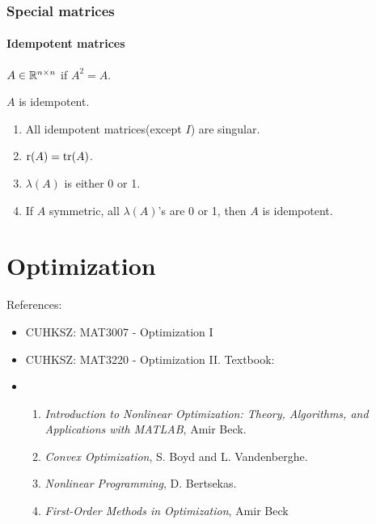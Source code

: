 \documentclass[10pt,a4paper]{book}
\begin{document}
\subsection{Special matrices}\label{sec:spec_mat}
\subsubsection{Idempotent matrices}\label{sec:idempotent}
\begin{defbox}
	\begin{definition}\label{def:idempotent}
		$A\in\mathbb R^{n\times n}$ if $A^2=A$.  
	\end{definition}
\end{defbox}

\begin{thmbox}
	\begin{theorem}\label{thm:idempotent}
		$A$ is idempotent.  
		\begin{enumerate}
			\item All idempotent matrices(except $I$) are singular.
			\item $\mathrm{r}(A)=\mathrm{tr}(A)$. 
			\item $\lambda(A)$ is either 0 or 1. 
			\item If $A$ symmetric, all $\lambda(A)$'s are 0 or 1, then $A$ is idempotent. 
		\end{enumerate}
	\end{theorem}
\end{thmbox}

\chapter{Optimization}\label{chap:opt}

References: 
\begin{itemize}
	\item CUHKSZ: MAT3007 - Optimization I
	\item CUHKSZ: MAT3220 - Optimization II. Textbook: 
	\item \begin{enumerate}
		\item \textit{Introduction to Nonlinear Optimization: Theory, Algorithms, and
		Applications with MATLAB}, Amir Beck.
		\item \textit{Convex Optimization}, S. Boyd and L. Vandenberghe.
		\item \textit{Nonlinear Programming}, D. Bertsekas.
		\item \textit{First-Order Methods in Optimization}, Amir Beck
	\end{enumerate}
\end{itemize}
\end{document}
